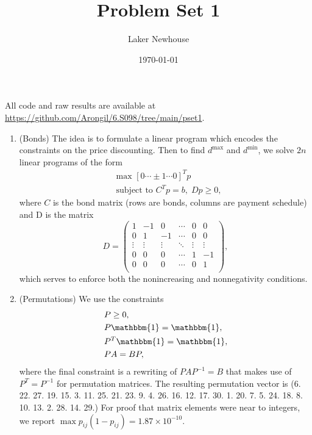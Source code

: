 \documentclass{article}
\title{Problem Set 1}
\author{Laker Newhouse}
\date{\today}
\begin{document}
\maketitle	

All code and raw results are available at \url{https://github.com/Arongil/6.S098/tree/main/pset1}.
\begin{enumerate}
    \item (Bonds) The idea is to formulate a linear program which encodes the constraints on the price discounting. Then to find $d^\text{max}$ and $d^\text{min}$, we solve $2n$ linear programs of the form \begin{align*}
        & \text{max } [0 \cdots \pm 1 \cdots 0]^T p \\
        & \text{subject to } C^T p = b, \; Dp \geq 0,
    \end{align*} where $C$ is the bond matrix (rows are bonds, columns are payment schedule) and D is the matrix \[
        D = \begin{pmatrix}
            1 & -1 & 0 & \cdots & 0 & 0 \\
            0 & 1 & -1 & \cdots & 0 & 0 \\
            \vdots & \vdots & \vdots & \ddots & \vdots & \vdots \\
            0 & 0 & 0 & \cdots & 1 & -1 \\
            0 & 0 & 0 & \cdots & 0 & 1 \\
        \end{pmatrix},
    \] which serves to enforce both the nonincreasing and nonnegativity conditions.
    
    \item (Permutations) We use the constraints \begin{align*}
    	&P \geq 0, \\
    	&P \mathbbm{1} = \mathbbm{1}, \\
    	&P^T \mathbbm{1} = \mathbbm{1}, \\
    	&P A = B P,
    \end{align*} where the final constraint is a rewriting of $PAP^{-1} = B$ that makes use of $P^T = P^{-1}$ for permutation matrices. The resulting permutation vector is (6. 22. 27. 19. 15.  3. 11. 25. 21. 23.  9.  4. 26. 16. 12. 17. 30.  1. 20.  7.  5. 24. 18.  8. 10. 13.  2. 28. 14. 29.) For proof that matrix elements were near to integers, we report $\max p_{ij}(1 - p_{ij}) = 1.87 \times 10^{-10}$.
    

\end{enumerate}
\end{document}
